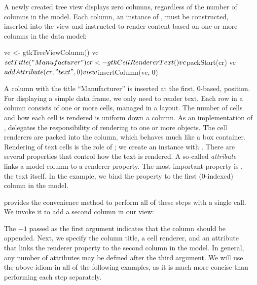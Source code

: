 A newly created tree view displays zero columns, regardless of the
number of columns in the model. Each column, an instance of
, must be constructed, inserted into the view and
instructed to render content based on one or more columns in the data
model:
\begin{Schunk}
\begin{Sinput}
 vc <- gtkTreeViewColumn()
 vc$setTitle("Manufacturer")
 cr <- gtkCellRendererText()
 vc$packStart(cr)
 vc$addAttribute(cr, "text", 0)
 view$insertColumn(vc, 0)
\end{Sinput}
\end{Schunk}
%
A column with the title ``Manufacturer'' is inserted at the first,
$0$-based, position. For displaying a simple data frame, we only need
to render text. Each row in a column consists of one or more cells,
managed in a layout. The number of cells and how each cell is rendered
is uniform down a column. As an implementation of
,  delegates the
responsibility of rendering to one or more 
objects. The cell renderers are packed into the column, which behaves
much like a box container. Rendering of text cells is the role of
; we create an instance with
. There are several properties that
control how the text is rendered. A so-called \textit{attribute} links
a model column to a renderer property. The most important property is
, the text itself. In the example, we bind the 
property to the first ($0$-indexed) column in the model.

 provides the
 convenience method to
perform all of these steps with a single call. We invoke it to add a
second column in our view:
\begin{Schunk}
\end{Schunk}
% 
The $-1$ passed as the first argument indicates that the column should
be appended. Next, we specify the column title, a cell renderer, and
an attribute that links the  renderer property to the
second column in the model. In general, any number of attributes may
be defined after the third argument.  We will use the above idiom in
all of the following examples, as it is much more concise than
performing each step separately.

